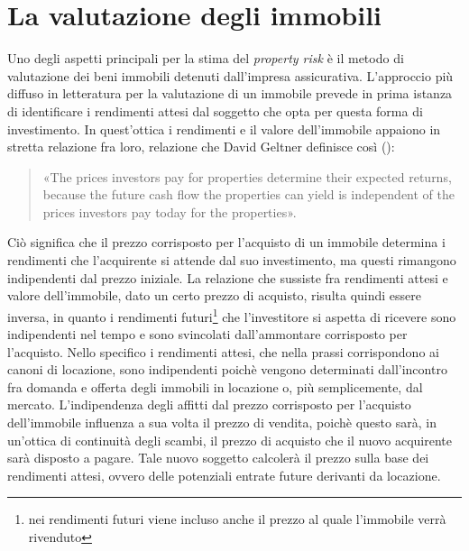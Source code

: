 \section{La valutazione degli immobili}
\label{sec:valimmobili}
Uno degli aspetti principali per la stima del {\itshape property risk} è il metodo di valutazione dei beni immobili detenuti dall'impresa assicurativa. 
L'approccio più diffuso in letteratura per la valutazione di un immobile prevede in prima istanza  di identificare i rendimenti attesi dal soggetto che opta per questa forma di investimento. In quest'ottica i rendimenti e il valore dell'immobile appaiono in stretta relazione fra loro, relazione che David Geltner definisce così (\cite[p. 202]{geltner}):
\begin{quotation}
«The prices investors pay for properties determine their expected returns, because the future cash flow the properties can yield is independent of the prices investors pay today for the properties».
\end{quotation}
Ciò significa che il prezzo corrisposto per l'acquisto di un immobile determina i rendimenti che l'acquirente si attende dal suo investimento, ma questi rimangono indipendenti dal prezzo iniziale.
La relazione che sussiste fra rendimenti attesi e valore dell'immobile, dato un certo prezzo di acquisto, risulta quindi essere inversa, in quanto i rendimenti futuri\footnote{nei rendimenti futuri viene incluso anche il prezzo al quale l'immobile verrà rivenduto} che l'investitore si aspetta di ricevere sono indipendenti nel tempo e sono svincolati dall'ammontare corrisposto per l'acquisto. Nello specifico i rendimenti attesi, che nella prassi corrispondono ai canoni di locazione, sono indipendenti poichè vengono determinati dall'incontro fra domanda e offerta degli immobili in locazione o, più semplicemente, dal mercato. L'indipendenza degli affitti dal prezzo corrisposto per l'acquisto dell'immobile influenza a sua volta il prezzo di vendita, poichè questo sarà, in un'ottica di continuità degli scambi, il prezzo di acquisto che il nuovo acquirente sarà disposto a pagare. Tale nuovo soggetto calcolerà il prezzo sulla base dei rendimenti attesi, ovvero delle potenziali entrate future derivanti da locazione.
